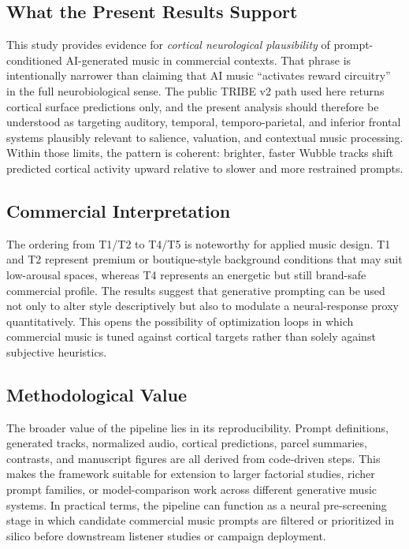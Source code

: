 \documentclass[conference]{IEEEtran}
\begin{document}
\subsection{What the Present Results Support}

This study provides evidence for \emph{cortical neurological plausibility} of prompt-conditioned AI-generated music in commercial contexts. That phrase is intentionally narrower than claiming that AI music ``activates reward circuitry'' in the full neurobiological sense. The public TRIBE v2 path used here returns cortical surface predictions only, and the present analysis should therefore be understood as targeting auditory, temporal, temporo-parietal, and inferior frontal systems plausibly relevant to salience, valuation, and contextual music processing. Within those limits, the pattern is coherent: brighter, faster Wubble tracks shift predicted cortical activity upward relative to slower and more restrained prompts.

\subsection{Commercial Interpretation}

The ordering from T1/T2 to T4/T5 is noteworthy for applied music design. T1 and T2 represent premium or boutique-style background conditions that may suit low-arousal spaces, whereas T4 represents an energetic but still brand-safe commercial profile. The results suggest that generative prompting can be used not only to alter style descriptively but also to modulate a neural-response proxy quantitatively. This opens the possibility of optimization loops in which commercial music is tuned against cortical targets rather than solely against subjective heuristics.

\subsection{Methodological Value}

The broader value of the pipeline lies in its reproducibility. Prompt definitions, generated tracks, normalized audio, cortical predictions, parcel summaries, contrasts, and manuscript figures are all derived from code-driven steps. This makes the framework suitable for extension to larger factorial studies, richer prompt families, or model-comparison work across different generative music systems. In practical terms, the pipeline can function as a neural pre-screening stage in which candidate commercial music prompts are filtered or prioritized in silico before downstream listener studies or campaign deployment.
\end{document}
